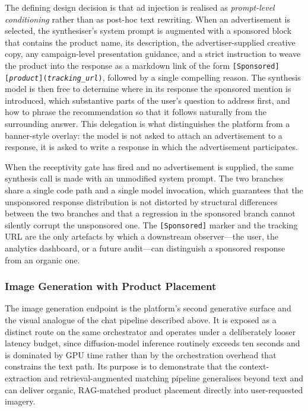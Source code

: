 The defining design decision is that ad injection is realised as
\emph{prompt-level conditioning} rather than as post-hoc text
rewriting. When an advertisement is selected, the synthesiser's
system prompt is augmented with a sponsored block that contains the
product name, its description, the advertiser-supplied creative copy,
any campaign-level presentation guidance, and a strict instruction to
weave the product into the response as a markdown link of the form
\texttt{[Sponsored] [\textit{product}](\textit{tracking\_url})},
followed by a single compelling reason. The synthesis model is then
free to determine where in its response the sponsored mention is
introduced, which substantive parts of the user's question to address
first, and how to phrase the recommendation so that it follows
naturally from the surrounding answer. This delegation is what
distinguishes the platform from a banner-style overlay: the model is
not asked to attach an advertisement to a response, it is asked to
write a response in which the advertisement participates.

When the receptivity gate has fired and no advertisement is supplied,
the same synthesis call is made with an unmodified system prompt. The
two branches share a single code path and a single model invocation,
which guarantees that the unsponsored response distribution is not
distorted by structural differences between the two branches and that
a regression in the sponsored branch cannot silently corrupt the
unsponsored one. The \texttt{[Sponsored]} marker and the tracking URL
are the only artefacts by which a downstream observer---the user, the
analytics dashboard, or a future audit---can distinguish a sponsored
response from an organic one.

\subsubsection{Image Generation with Product Placement}
\label{subsubsec:image-generation}

The image generation endpoint is the platform's second generative
surface and the visual analogue of the chat pipeline described above.
It is exposed as a distinct route on the same orchestrator and
operates under a deliberately looser latency budget, since
diffusion-model inference routinely exceeds ten seconds and is
dominated by GPU time rather than by the orchestration overhead that
constrains the text path. Its purpose is to demonstrate that the
context-extraction and retrieval-augmented matching pipeline
generalises beyond text and can deliver organic, RAG-matched product
placement directly into user-requested imagery.

